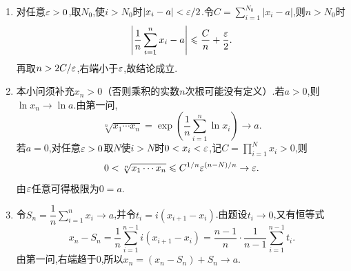 \documentclass{ctexart}
\begin{document}
\begin{solution}
\begin{enumerate}[label=\textbf{(\arabic*)}]
        \item 对任意$\varepsilon>0$,取$N_0$,使$i>N_0$时$|x_i-a|<\varepsilon/2$.令$C=\sum_{i=1}^{N_0}|x_i-a|$,则$n>N_0$时
            \[\left|\dfrac1n\sum_{i=1}^nx_i-a\right|\leqslant\dfrac Cn+\dfrac{\varepsilon}2.\]
            再取$n>2C/\varepsilon$,右端小于$\varepsilon$,故结论成立.
        \item 本小问须补充$x_n>0$（否则乘积的实数$n$次根可能没有定义）.若$a>0$,则$\ln x_n\to\ln a$.由第一问,
            \[\sqrt[n]{x_1\cdots x_n}=\exp\left(\dfrac1n\sum_{i=1}^n\ln x_i\right)\to a.\]
            若$a=0$,对任意$\varepsilon>0$取$N$使$i>N$时$0<x_i<\varepsilon$,记$C=\prod_{i=1}^Nx_i>0$,则
            \[0<\sqrt[n]{x_1\cdots x_n}\leqslant C^{1/n}\varepsilon^{(n-N)/n}\to\varepsilon.\]
            由$\varepsilon$任意可得极限为$0=a$.
        \item 令$S_n=\dfrac1n\sum_{i=1}^nx_i\to a$,并令$t_i=i(x_{i+1}-x_i)$.由题设$t_i\to0$,又有恒等式
            \[x_n-S_n=\dfrac1n\sum_{i=1}^{n-1}i(x_{i+1}-x_i)=\dfrac{n-1}n\cdot\dfrac1{n-1}\sum_{i=1}^{n-1}t_i.\]
            由第一问,右端趋于$0$,所以$x_n=(x_n-S_n)+S_n\to a$.
    \end{enumerate}
\end{solution}
\end{document}
